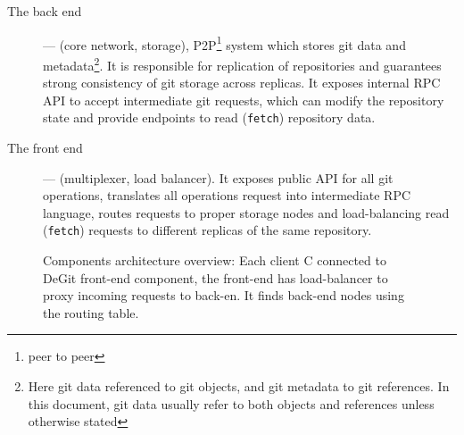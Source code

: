 \documentclass[acmlarge, screen, nonacm, 11pt]{acmart}
\newcommand{\code}[1]{\texttt{#1}}
\begin{document}
\begin{description}
  \item[The back end] --- (core network, storage), P2P\footnote{peer to peer} system which stores git data
    and metadata\footnote{Here git data referenced to git objects, and git metadata to git references.
    In this document, git data usually refer to both objects and references unless otherwise stated}.
    It is responsible for replication of repositories and guarantees
    strong consistency of git storage across replicas. It exposes internal RPC API to accept intermediate git 
    requests, which can modify the repository state and provide endpoints to read (\code{fetch}) repository data.
  \item[The front end] --- (multiplexer, load balancer). It exposes public API for all git operations,
    translates all operations request into intermediate RPC language, routes requests to proper storage
    nodes and load-balancing read (\code{fetch}) requests to different replicas of the same repository.
\end{description}

\begin{figure}
  \begin{center}
  \end{center}
  \caption{
    Components architecture overview:
    Each client C connected to DeGit front-end component,
    the front-end has load-balancer to proxy incoming requests to back-en.
    It finds back-end nodes using the routing table.
  }\label{fig:comp-arc-overview}
\end{figure}
\end{document}
